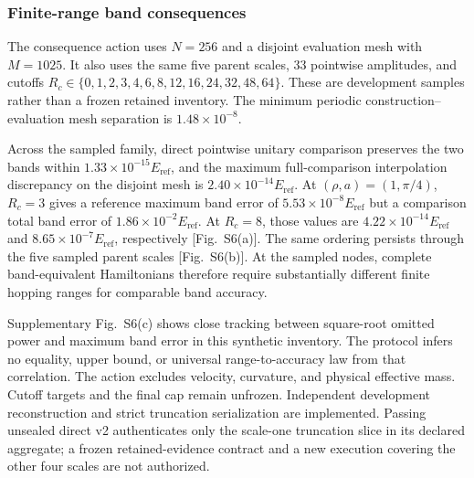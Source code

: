 \documentclass[aps,prb,reprint,amsmath,amssymb,longbibliography,floatfix]{revtex4-2}
\begin{document}
\subsubsection{Finite-range band consequences}

The consequence action uses $N=256$ and a disjoint evaluation mesh with $M=1025$. It
also uses the same five parent scales, 33 pointwise amplitudes, and cutoffs
$R_c\in\{0,1,2,3,4,6,8,12,16,24,32,48,64\}$. These are development samples rather than
a frozen retained inventory. The minimum periodic construction--evaluation mesh
separation is $1.48\times10^{-8}$.

Across the sampled family, direct pointwise unitary comparison preserves the two bands
within $1.33\times10^{-15}E_{\mathrm{ref}}$, and the maximum full-comparison interpolation discrepancy on
the disjoint mesh is $2.40\times10^{-14}E_{\mathrm{ref}}$. At $(\rho,a)=(1,\pi/4)$, $R_c=3$ gives a
reference maximum band error of $5.53\times10^{-8}E_{\mathrm{ref}}$ but a comparison total band error
of $1.86\times10^{-2}E_{\mathrm{ref}}$. At $R_c=8$, those values are
$4.22\times10^{-14}E_{\mathrm{ref}}$ and $8.65\times10^{-7}E_{\mathrm{ref}}$, respectively
[Fig.~S6(a)]. The same ordering persists
through the five sampled parent scales [Fig.~S6(b)]. At
the sampled nodes, complete band-equivalent Hamiltonians therefore require substantially
different finite hopping ranges for comparable band accuracy.

Supplementary Fig.~S6(c) shows close tracking between square-root
omitted power and maximum band error in this synthetic inventory. The protocol infers no
equality, upper bound, or universal range-to-accuracy law from that correlation. The
action excludes velocity, curvature, and physical effective mass. Cutoff targets and the
final cap remain unfrozen. Independent development reconstruction and strict truncation serialization are
implemented. Passing unsealed direct v2 authenticates only the scale-one truncation
slice in its declared aggregate; a frozen retained-evidence contract and a new execution
covering the other four scales are not authorized.
\end{document}
